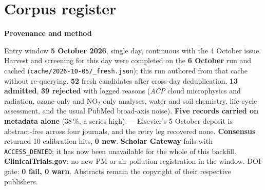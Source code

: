 \documentclass[10pt]{article}
\begin{document}
\clearpage
\section*{\sffamily\bfseries\color{Deep}Corpus register}
\vspace{-1.5mm}{\color{Amber}\rule{\linewidth}{1.1pt}}\vspace{2.5mm}



\vspace{2mm}

\begin{keybox}
{\sffamily\bfseries\footnotesize\color{Deep}Provenance and method}\\[1.2mm]
{\fontsize{7.2}{8.8}\selectfont
Entry window \textbf{5 October 2026}, single day, continuous with the 4 October issue. Harvest
and screening for this day were completed on the \textbf{6 October} run and cached
(\texttt{cache/2026-10-05/\_fresh.json}); this run authored from that cache without re-querying.
\textbf{52} fresh candidates after cross-day deduplication, \textbf{13 admitted}, \textbf{39 rejected} with
logged reasons (\textit{ACP} cloud microphysics and radiation, ozone-only and NO$_2$-only analyses, water
and soil chemistry, life-cycle assessment, and the usual PubMed broad-axis noise). \textbf{Five records
carried on metadata alone} (38\,\%, a series high) --- Elsevier's 5 October deposit is abstract-free across
four journals, and the retry leg recovered none. \textbf{Consensus} returned 10 calibration hits,
\textbf{0 new}. \textbf{Scholar Gateway} fails with \texttt{ACCESS\_DENIED}; it has now been unavailable
for the whole of this backfill. \textbf{ClinicalTrials.gov}: no new PM or air-pollution registration in the
window. DOI gate: \textbf{0 fail, 0 warn}. Abstracts remain the copyright of their respective
publishers.\par}
\end{keybox}
\end{document}
